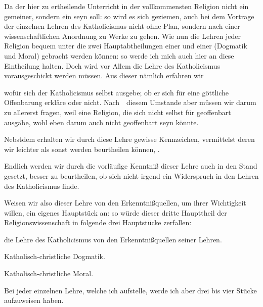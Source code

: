 \begin{aufza}
\item Da der hier zu ertheilende Unterricht in der vollkommensten Religion nicht ein gemeiner, sondern ein  seyn soll: so wird es sich geziemen, auch bei dem Vortrage der einzelnen Lehren des Katholicismus nicht ohne Plan, sondern nach einer wissenschaftlichen Anordnung zu Werke zu gehen. Wie nun die Lehren jeder Religion bequem unter die zwei Hauptabtheilungen einer  und einer  (Dogmatik und Moral) gebracht werden können: so werde ich mich auch hier an diese Eintheilung halten. Doch wird vor Allem die Lehre des Katholicismus  vorausgeschickt werden müssen. Aus dieser nämlich erfahren wir
\begin{aufzb}
\item wofür sich der Katholicismus selbst ausgebe; ob er sich für eine göttliche Offenbarung erkläre oder nicht. Nach~\ diesem Umstande aber müssen wir darum zu allererst fragen, weil eine Religion, die sich nicht selbst für geoffenbart ausgäbe, wohl eben darum auch nicht geoffenbart seyn könnte.
\item Nebstdem erhalten wir durch diese Lehre gewisse Kennzeichen, vermittelst deren wir leichter als sonst werden beurtheilen können, .
\item Endlich werden wir durch die vorläufige Kenntniß dieser Lehre auch in den Stand gesetzt, besser zu beurtheilen, ob sich nicht irgend ein Widerspruch in den Lehren des Katholicismus finde.
\end{aufzb}
\item Weisen wir also dieser Lehre von den Erkenntnißquellen, um ihrer Wichtigkeit willen, ein eigenes Hauptstück an: so würde dieser dritte Haupttheil der Religionswissenschaft in folgende drei Hauptstücke zerfallen:
\begin{aufzb}
\item[\RWbet{Erstes Hauptstück:}] die Lehre des Katholicismus von den Erkenntnißquellen seiner Lehren.
\item[\RWbet{Zweites Hauptstück:}] Katholisch-christliche Dogmatik.
\item[\RWbet{Drittes Hauptstück:}] Katholisch-christliche Moral.
\end{aufzb}
\item Bei jeder einzelnen Lehre, welche ich aufstelle, werde ich aber drei bis vier Stücke aufzuweisen haben.

\end{aufza}
